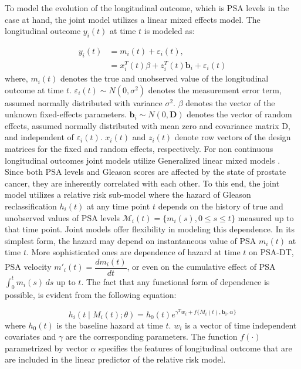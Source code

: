 To model the evolution of the longitudinal outcome, which is PSA levels in the case at hand, the joint model utilizes a linear mixed effects model. The longitudinal outcome $y_i(t)$ at time $t$ is modeled as:

\begin{equation*}
\begin{split}
y_i(t) &= m_i(t) + \varepsilon_i(t), \\
&= x_i^T(t) \beta + z_i^T(t) \boldsymbol{b}_i + \varepsilon_i(t)
\end{split}
\end{equation*}
where, $m_i(t)$ denotes the true and unobserved value of the longitudinal outcome at time $t$. $\varepsilon_i(t) \sim N(0, \sigma^2)$ denotes the measurement error term, assumed normally distributed with variance $\sigma^2$. $\beta$ denotes the vector of the unknown fixed-effects parameters. $\boldsymbol{b}_i \sim N(0, \boldsymbol{D})$ denotes the vector of random effects, assumed normally distributed with mean zero and covariance matrix D, and independent of $\varepsilon_i(t)$. $x_i(t)$ and $z_i(t)$ denote row vectors of the design matrices for the fixed and random effects, respectively. For non continuous longitudinal outcomes joint models utilize Generalized linear mixed models \citep{rizopoulos2012joint}.\\

Since both PSA levels and Gleason scores are affected by the state of prostate cancer, they are inherently correlated with each other. To this end, the joint model utilizes a relative risk sub-model where the hazard of Gleason reclassification $h_i(t)$ at any time point $t$ depends on the history of true and unobserved values of PSA levels $\mathcal{M}_i(t) = \{m_i(s), 0\leq s \leq t\}$ measured up to that time point. Joint models offer flexibility in modeling this dependence. In its simplest form, the hazard may depend on instantaneous value of PSA $m_i(t)$ at time $t$. More sophisticated ones are dependence of hazard at time $t$ on PSA-DT, PSA velocity $m'_i(t) = \dfrac{d m_i(t)}{dt}$, or even on the cumulative effect of PSA $\int_0^t m_i(s) \,ds$ up to $t$. The fact that any functional form of dependence is possible, is evident from the following equation:

\begin{equation*}
h_i(t \mid M_i(t); \theta) = h_0(t) e^{\gamma^Tw_i + f\{M_i(t), \boldsymbol{b}_i, \alpha\}}
\end{equation*}
where $h_0(t)$ is the baseline hazard at time $t$. $w_i$ is a vector of time independent covariates and $\gamma$ are the corresponding parameters. The function $f(\cdot)$ parametrized by vector $\alpha$ specifies the features of longitudinal outcome that are are included in the linear predictor of the relative risk model.\\

